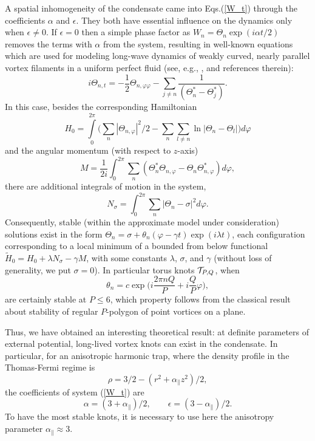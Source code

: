 \documentclass[pra,twocolumn,showpacs]{revtex4}
\begin{document}
A spatial inhomogeneity of the condensate came into Eqs.(\ref{W_t}) through the coefficients 
$\alpha$ and $\epsilon$. They both have essential influence on the dynamics only when $\epsilon\neq 0$.
If $\epsilon=0$ then a simple phase factor as $W_n=\Theta_n\exp(i\alpha t/2)$ removes the terms with 
$\alpha$ from the system, resulting in well-known equations which are used for modeling long-wave 
dynamics of weakly curved, nearly parallel vortex filaments in a uniform perfect fluid (see, e.g.,
\cite{v_filaments1,v_filaments2,v_filaments3,v_filaments4}, and references therein):
\begin{equation}
i\Theta_{n,t}=-\frac{1}{2}\Theta_{n,\varphi\varphi} -\sum_{j\neq n}\frac{1}{(\Theta^*_n-\Theta^*_j)}.
\label{Theta_t}
\end{equation}
In this case, besides the corresponding Hamiltonian
\begin{equation}
H_0=\int\limits_0^{2\pi}\Big(\sum_n |\Theta_{n,\varphi}|^2/2 
-\sum_n\sum_{l\neq n}\ln|\Theta_n-\Theta_l|\Big) d\varphi
\label{H_0}
\end{equation}
and the angular momentum (with respect to $z$-axis)
\begin{equation}
M=\frac{1}{2i}\int_0^{2\pi}\sum_n(\Theta_n^*\Theta_{n,\varphi}-\Theta_n\Theta^*_{n,\varphi})d\varphi,
\end{equation}
there are additional integrals of motion in the system,
\begin{equation}
N_{\sigma}=\int_0^{2\pi}\sum_n |\Theta_n-\sigma|^2 d\varphi.
\end{equation}
Consequently, stable (within the approximate model under consideration) solutions exist in the form
$\Theta_n=\sigma+ \theta_n(\varphi-\gamma t)\exp(i\lambda t)$, each configuration corresponding to 
a local minimum of a bounded from below functional $\tilde H_0= H_0+\lambda N_\sigma -\gamma M$,
with some constants $\lambda$, $\sigma$, and $\gamma$ (without loss of generality, we put $\sigma=0$).
In particular torus knots ${\cal T}_{P,Q}$, when
\begin{equation}
\theta_n=c\exp\Big(i\frac{2\pi nQ}{P}+i\frac{Q}{P}\varphi\Big), 
\end{equation}
are certainly stable at $P\leq 6$, which property follows from the classical result about stability
of regular $P$-polygon of point vortices on a plane.

Thus, we have obtained an interesting theoretical result: at definite parameters of external
potential, long-lived vortex knots can exist in the condensate. In particular, for an anisotropic 
harmonic trap, where the density profile in the Thomas-Fermi regime is
$$
\rho=3/2-(r^2+\alpha_\parallel z^2)/2,
$$ 
the coefficients of system (\ref{W_t})  are
$$
\alpha=(3+\alpha_\parallel)/2, \qquad \epsilon=(3-\alpha_\parallel)/2.
$$
To have the most stable knots, it is necessary to use here the anisotropy parameter 
$\alpha_\parallel\approx3$.
\end{document}
